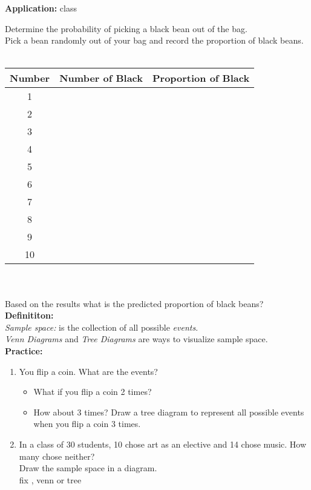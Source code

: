 \documentclass[12pt]{article}
\begin{document}
\clearpage 

\textbf{Application:} class

Determine the probability of picking a black bean out of the bag. \\

 Pick a bean randomly out of your bag and record the proportion of black beans. \\
\\
\begin{tabular}{| c | c | r |}
 \hline 
Number & Number of Black & Proportion of Black \\  \hline 
1 &  & \\ \hline 
2 & & \\ \hline 
3 & & \\ \hline 
4 & & \\  \hline 
5 & & \\  \hline 
6 & & \\ \hline 
7 & & \\ \hline 
8 & & \\ \hline 
9 & & \\ \hline 
10 & & \\ \hline 
\end{tabular}
\\
\\
Based on the results what is the predicted proportion of black beans? \\

\textbf{Definititon:}\\

\textit{Sample space:}  is the collection of all possible \textit{events}. \\

\textit{Venn Diagrams} and \textit{ Tree Diagrams} are ways to visualize sample space.
\\

\textbf{Practice:}

\begin{enumerate}
\item You flip a coin. What are the events?\\

\begin{itemize}
 \item What if you flip a coin 2 times?\\
 
 \item How about 3 times? Draw a tree diagram to represent all possible events when you flip a coin 3 times.\\
\vspace{5em}

  \end{itemize}
  
\item In a class of 30 students, 10 chose art as an elective and 14 chose music. How many chose neither?\\
Draw the sample space in a diagram.\\ fix , venn  or tree

 \end{enumerate}
 
\end{document}
